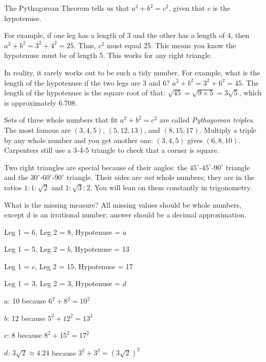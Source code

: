 
The Pythagorean Theorem tells us that $a^2 + b^2 = c^2$, given that $c$ is the hypotenuse.

For example, if one leg has a length of 3 and the other has a length of 4, then
$a^2 + b^2 = 3^2 + 4^2 = 25$. Thus, $c^2$ must equal 25. This means you know
the hypotenuse must be of length 5. This works for any right triangle.

In reality, it rarely works out to be such a tidy number. For
example, what is the length of the hypotenuse if the two legs are 3
and 6? $a^2 + b^2 = 3^2 + 6^2 = 45$.  The length of the hypotenuse is
the square root of that: $\sqrt{45} = \sqrt{9 \times 5} = 3 \sqrt{5}$,
which is approximately 6.708.

Sets of three whole numbers that fit $a^2 + b^2 = c^2$ are called \emph{Pythagorean triples}. The most famous are $(3, 4, 5)$, $(5, 12, 13)$, and $(8, 15, 17)$. Multiply a triple by any whole number and you get another one: $(3, 4, 5)$ gives $(6, 8, 10)$. Carpenters still use a 3-4-5 triangle to check that a corner is square.

Two right triangles are special because of their angles: the $45^\circ$-$45^\circ$-$90^\circ$ triangle and the $30^\circ$-$60^\circ$-$90^\circ$ triangle. Their sides are \emph{not} whole numbers; they are in the ratios $1 : 1 : \sqrt{2}$ and $1 : \sqrt{3} : 2$. You will lean on them constantly in trigonometry.

\begin{Exercise}[title={Find the Missing Length}, label=missingsides]
What is the missing measure? All missing values should be whole numbers, except d is an irrational number; answer should be a decimal approximation.

Leg 1 = 6, Leg 2 = 8, Hypotenuse = $a$

Leg 1 = 5, Leg 2 = $b$, Hypotenuse = 13 
  
Leg 1 = $c$, Leg 2 = 15, Hypotenuse = 17 

Leg 1 = 3, Leg 2 = 3, Hypotenuse = $d$
\end{Exercise}
\begin{Answer}[ref=missingsides]
  $a$: 10 because $6^2 + 8^2 = 10^2$

  $b$: 12 because $5^2 + 12^2 = 13^2$

  $c$: 8 because $8^2 + 15^2 = 17^2$

  $d$: $3\sqrt{2} \approx 4.24$ because $3^2 + 3^2 = \left(3 \sqrt{2}\right)^2$
\end{Answer}

